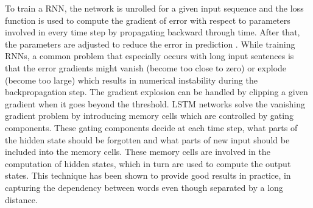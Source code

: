 \documentclass[a4paper, 11pt]{article}
\begin{document}
To train a RNN, the network is unrolled for a given input sequence and the loss function is used to compute the gradient of error with respect to parameters involved in every time step by propagating backward through time. After that, the parameters are adjusted to reduce the error in prediction \parencite{Werbos1990}. While training RNNs, a common problem that especially occurs with long input sentences is that the error gradients might vanish (become too close to zero) or explode (become too large) which results in numerical instability during the backpropagation step. The gradient explosion can be handled by clipping a given gradient when it goes beyond the threshold. LSTM networks \parencite{Hochreiter1997} solve the vanishing gradient problem by introducing memory cells which are controlled by gating components. These gating components decide at each time step, what parts of the hidden state should be forgotten and what parts of new input should be included into the memory cells. These memory cells are involved in the computation of hidden states, which in turn are used to compute the output states. This technique has been shown to provide good results in practice, in capturing the dependency between words even though separated by a long distance.

\end{document}

